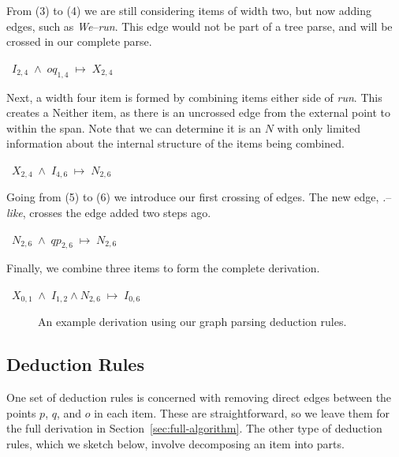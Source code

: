 \noindent
\parbox{4.5in}{
From (3) to (4) we are still considering items of width two, but now adding edges, such as \emph{We}--\emph{run}.
This edge would not be part of a tree parse, and will be crossed in our complete parse. \\
}\hfill\mbox{
  $I_{2,4} \; \land \; oq_{1,4} \; \mapsto \; X_{2,4}$ 
}

\noindent
\parbox{4.5in}{
Next, a width four item is formed by combining items either side of \emph{run}.
This creates a Neither item, as there is an uncrossed edge from the external point to within the span.
Note that we can determine it is an $N$ with only limited information about the internal structure of the items being combined. \\
}\hfill\mbox{
  $X_{2,4} \; \land \; I_{4,6} \; \mapsto \; N_{2,6}$
}

\noindent
\parbox{4.5in}{
Going from (5) to (6) we introduce our first crossing of edges.
The new edge, \emph{.}--\emph{like}, crosses the edge added two steps ago. \\
}\hfill\mbox{
  $N_{2,6} \; \land \; qp_{2,6} \; \mapsto \; N_{2,6}$ 
}

\noindent
\parbox{4in}{
Finally, we combine three items to form the complete derivation. \\
}\hfill\mbox{
  $X_{0,1} \; \land \; I_{1,2} \land N_{2,6} \; \mapsto \; I_{0,6}$
}

\begin{figure}
\centering
\vspace{-5mm}

\caption{\label{fig:alg-example}
An example derivation using our graph parsing deduction rules.
}
\end{figure}

\begin{landscape}

\end{landscape}

\subsection{Deduction Rules} \label{sec:deduction-rules-sketch}

\newlength{\deductionCaptionLength}
\newlength{\deductionRuleLength}
\setlength{\deductionCaptionLength}{0.32\textwidth}
\setlength{\deductionRuleLength}{0.95\textwidth}

One set of deduction rules is concerned with removing direct edges between the points $p$, $q$, and $o$ in each item.
These are straightforward, so we leave them for the full derivation in Section~\ref{sec:full-algorithm}.
The other type of deduction rules, which we sketch below, involve decomposing an item into parts.

